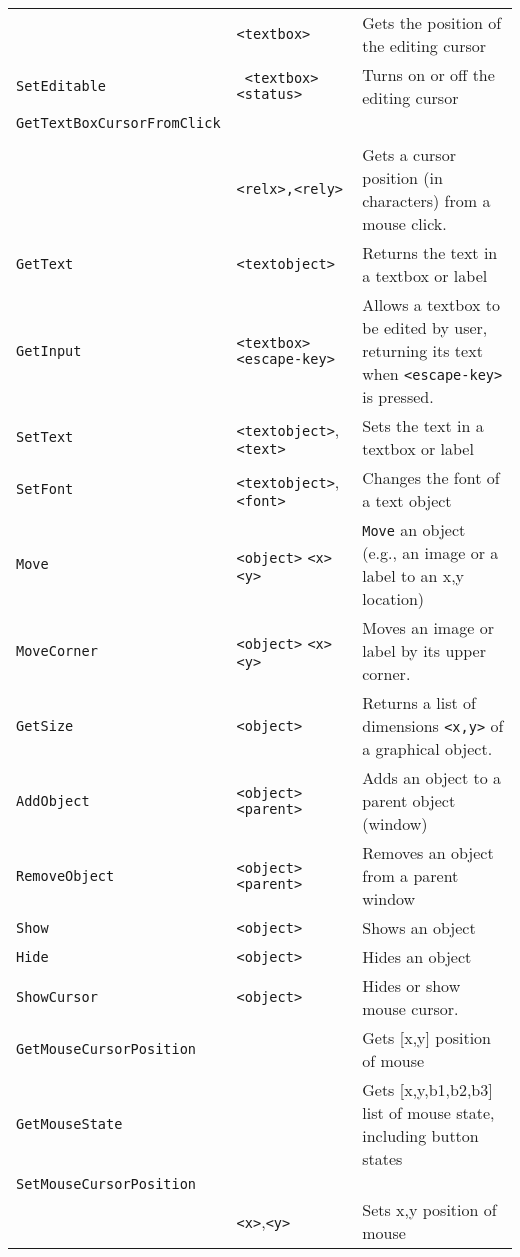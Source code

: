\begin{longtable}{p{3cm}p{3cm}p{6cm}}
   &\verb+<textbox>+ &Gets the position of the editing cursor\\ 
\verb+SetEditable+ &\verb+ <textbox>+ \verb+<status>+& Turns on or off the editing cursor\\ 
\verb+GetTextBoxCursorFromClick+&\\
\\ & \verb+<relx>,<rely>+ & Gets a cursor position (in characters) from a mouse click.\\
\verb+GetText+ &\verb+<textobject>+ &Returns the text in a textbox or label\\ 
\verb+GetInput+ &\verb+<textbox>+ \verb+<escape-key>+& Allows a textbox to be edited by user, returning its text when \verb+<escape-key>+ is pressed.\\ 
\verb+SetText+ &\verb+<textobject>+, \verb+<text>+ &Sets the text in a textbox or label\\ 
\verb+SetFont+ &\verb+<textobject>+, \verb+<font>+ &Changes the font of a text object \\ 
\verb+Move+ &\verb+<object>+ \verb+<x>+ \verb+<y>+& \verb+Move+ an object (e.g., an image or a label to an x,y location) \\ 
\verb+MoveCorner+ &\verb+<object>+ \verb+<x>+ \verb+<y>+& Moves an image or label by its upper corner.\\ 
\verb+GetSize+ &\verb+<object>+ &Returns a list of dimensions \verb+<x,y>+ of a graphical object.\\ 
\verb+AddObject+ &\verb+<object>+ \verb+<parent>+ & Adds an object to a parent object (window)\\ 
\verb+RemoveObject+ &\verb+<object>+ \verb+<parent>+ &Removes an object from a parent window\\ 
\verb+Show+ &\verb+<object>+ &Shows an object\\ 
\verb+Hide+ &\verb+<object>+ &Hides an object\\ 
\verb+ShowCursor+ &\verb+<object>+ &Hides or show mouse cursor.\\
\verb+GetMouseCursorPosition+ & &Gets [x,y] position of mouse\\
\verb+GetMouseState+&&Gets [x,y,b1,b2,b3] list of mouse state, including button states\\
\verb+SetMouseCursorPosition+ \\
&\verb+<x>+,\verb+<y>+ &Sets x,y position of mouse\\


\end{longtable}

